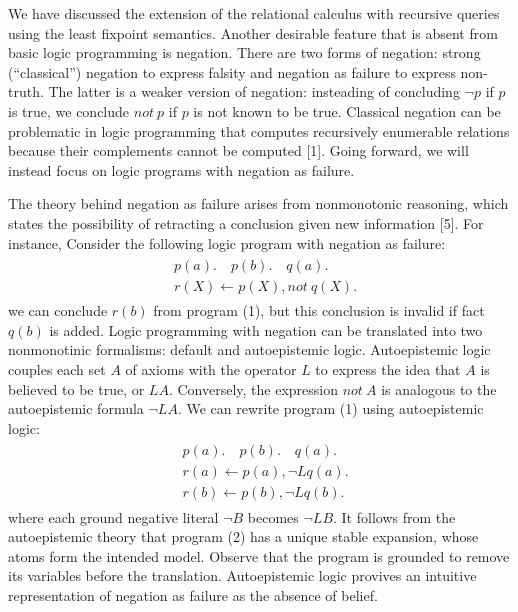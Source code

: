 We have discussed the extension of the relational calculus with recursive queries 
using the least fixpoint semantics. Another desirable feature that is absent from 
basic logic programming is negation. There are two forms of negation: strong (``classical'') 
negation to express falsity and negation as failure to express non-truth. The 
latter is a weaker version of negation: insteading of concluding 
$\neg p$ if $p$ is true, we conclude $not \: p$ if $p$ is not known to be true. 
Classical negation can be problematic in logic programming that computes 
recursively enumerable relations because their complements cannot be computed [1]. 
Going forward, we will instead focus on logic programs with negation as failure.

The theory behind negation as failure arises from nonmonotonic reasoning, which states 
the possibility of retracting a conclusion given new information [5]. For instance, 
Consider the following logic program with negation as failure:
\begin{align}
    \begin{split}
        & p(a). \hspace{1em} p(b). \hspace{1em} q(a). \\
        & r(X) \leftarrow p(X), not \: q(X).
    \end{split}
\end{align}
we can conclude $r(b)$ from 
program (1), but this conclusion is invalid if fact $q(b)$ is added. Logic programming with 
negation can be translated into two nonmonotinic formalisms: default and autoepistemic logic. 
Autoepistemic logic couples each set $A$ of axioms with the operator $L$ to express the idea that 
$A$ is believed to be true, or $LA$. Conversely, the expression $not \: A$ is analogous to the autoepistemic formula 
$\neg LA$. We can rewrite program (1) using autoepistemic logic:
\begin{align}
    \begin{split}
        & p(a). \hspace{1em} p(b). \hspace{1em} q(a). \\
        & r(a) \leftarrow p(a), \neg Lq(a). \\ 
        & r(b) \leftarrow p(b), \neg Lq(b).
    \end{split}
\end{align}
where each ground negative literal $\neg B$ becomes $\neg LB$. It follows from the 
autoepistemic theory that program (2) has a unique stable expansion, whose atoms 
form the intended model. Observe that the program is 
grounded to remove its variables before the translation. Autoepistemic logic provives an intuitive 
representation of negation as failure as the absence of belief. 

